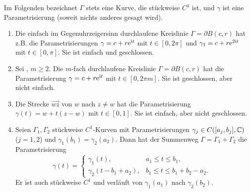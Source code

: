 \documentclass[a4paper,twoside,DIV15,BCOR12mm]{scrbook}
\begin{document}
\noindent Im Folgenden bezeichnet $\Gamma$ stets eine Kurve, die stückweise $C^1$ ist, und $\gamma$ ist eine Parametrisierung (soweit nichts anderes gesagt wird).

\begin{bsp} \label{bsp2.3}
\begin{enumerate}
\item \label{bsp2.3a} Die einfach im Gegenuhrzeigersinn durchlaufene Kreislinie $\Gamma=\partial B(c,r)$ hat z.B. die Parametrisierungen $\gamma=c+r\mathrm{e}^{\mathrm{i} t}$ mit $t\in[0,2\pi]$ und $\gamma_1=c+r\mathrm{e}^{2\mathrm{i} t}$ mit $t\in[0,\pi]$. Sie ist einfach und geschlossen.
\item \label{bsp2.3b} Sei , $m\ge2$. Die $m$-fach durchlaufene Kreislinie $\Gamma=\partial B(c,r)$ hat die Parametrisierung $\gamma=c+r\mathrm{e}^{\mathrm{i} t}$ mit $t\in[0,2\pi m]$. Sie ist geschlossen, aber nicht einfach.
\item \label{bsp2.3c} Die Strecke $\overrightarrow{wz}$ von $w$ nach $z \neq w$ hat die Parametrisierung $\gamma(t)=w+t(z-w)$ mit $t\in[0,1]$. Sie ist einfach, aber nicht geschlossen.
\item \label{bsp2.3d} Seien $\Gamma_1,\Gamma_2$ stückweise $C^1$-Kurven mit Parametrisierungen $\gamma_j\in C([a_j,b_j],\mathbb{C})$ ($j=1,2$) und $\gamma_1(b_1)=\gamma_2(a_2)$. Dann hat der Summenweg $\Gamma=\Gamma_1+\Gamma_2$ die Parametrisierung \[\gamma(t)=\begin{cases} \gamma_1(t),&a_1\le t\le b_1,\\ \gamma_2(t-b_1+a_2),&b_1\le t\le b_1+b_2-a_2.\end{cases}\] Er ist auch stückweise $C^1$ und verläuft von $\gamma_1(a_1)$ nach $\gamma_2(b_2)$.

\begin{center}
\end{center}


\end{enumerate}
\end{bsp}
\end{document}
